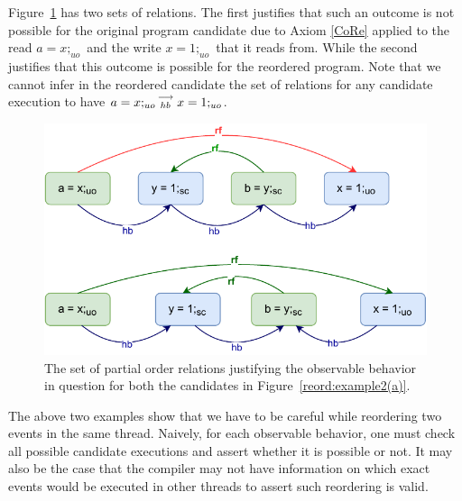         Figure~\ref{reord:example2(b)} has two sets of relations. 
        The first justifies that such an outcome is not possible for the original program candidate due to Axiom \ref{CoRe} applied to the read $a=x;_{uo}$ and the write $x=1;_{uo}$ that it reads from. 
        While the second justifies that this outcome is possible for the reordered program.
        Note that we cannot infer in the reordered candidate the set of relations for any candidate execution to have $a=x;_{uo}\stackrel{\longrightarrow}{_{hb}}x=1;_{uo}$. 
        \begin{figure}[H]
            \centering
            \includegraphics[scale=0.7]{4.InstructionReordering/0.Intro/ReorderingExample2(b).pdf}
            \caption{The set of partial order relations justifying the observable behavior in question for both the candidates in Figure~\ref{reord:example2(a)}.} 
            \label{reord:example2(b)}
        \end{figure}

        The above two examples show that we have to be careful while reordering two events in the same thread. 
        Naively, for each observable behavior, one must check all possible candidate executions and assert whether it is possible or not. 
        It may also be the case that the compiler may not have information on which exact events would be executed in other threads to assert such reordering is valid. 

    
    
    
    
    